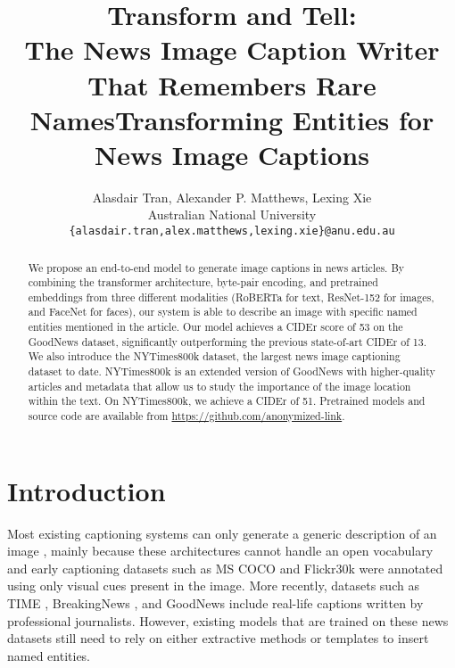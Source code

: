 \documentclass[10pt,twocolumn,letterpaper]{article}
\begin{document}
\title{Transform and Tell:\\The News Image Caption Writer That Remembers Rare Names}
\title{Transforming Entities for News Image Captions}

\author{Alasdair Tran, Alexander P. Matthews, Lexing Xie\\
Australian National University\\
{\tt\small \{alasdair.tran,alex.matthews,lexing.xie\}@anu.edu.au}
}

\maketitle

\begin{abstract}
   We propose an end-to-end model to generate image captions in news articles.
   By combining the transformer architecture, byte-pair encoding, and
   pretrained embeddings from three different modalities (RoBERTa for text,
   ResNet-152 for images, and FaceNet for faces), our system is able to
   describe an image with specific named entities mentioned in the article. Our
   model achieves a CIDEr score of 53 on the GoodNews dataset, significantly
   outperforming the previous state-of-art CIDEr of 13. We also introduce the
   NYTimes800k dataset, the largest news image captioning dataset to date.
   NYTimes800k is an extended version of GoodNews with higher-quality articles and
   metadata that allow us to study the importance of the image location within
   the text. On NYTimes800k, we achieve a CIDEr of 51. Pretrained models and
   source code are available from
   \href{https://github.com}{https://github.com/anonymized-link}.
\end{abstract}

\section{Introduction}

Most existing captioning systems can only generate a generic description of an
image \cite{Donahue2015LongTR, Vinyals2015ShowAT, Fang2015FromCT,
Karpathy2015DeepVA, Rennie2017SelfCriticalST, Lu2017KnowingWT,
Anderson2017BottomUpAT, Cornia2019ShowCT}, mainly because these architectures
cannot handle an open vocabulary and early captioning datasets such as MS COCO
\cite{Lin2014MicrosoftCC, Chen2015MicrosoftCC} and Flickr30k
\cite{Young2014FromID} were annotated using only visual cues present in the
image. More recently, datasets such as TIME \cite{Tariq2017ACE}, BreakingNews
\cite{Ramisa2016BreakingNewsAA}, and GoodNews \cite{Biten2019GoodNews} include
real-life captions written by professional journalists. However, existing
models that are trained on these news datasets still need to rely on either
extractive methods or templates to insert named entities.
\end{document}
